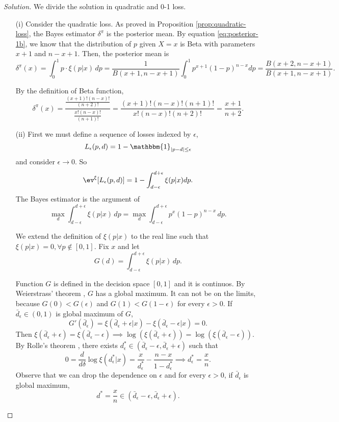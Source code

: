 \begin{proof}[Solution]
    We divide the solution in quadratic and 0-1 loss. 
    \begin{enumerate}
        \item[(i)] Consider the quadratic loss. As proved in Proposition \ref{prop:quadratic-loss}, the Bayes estimator $\delta^{\pi}$ is the
        posterior mean. By equation \ref{eq:posterior-1b}, we know that the
        distribution of $p$ given $X = x$ is Beta with parameters $x+1$ and
        $n-x+1$. Then, the posterior mean is 
        $$
        \delta^{\pi}(x) = \int_0^1 p \cdot\xi(p|x) \, dp = \frac{1}{B(x+1,n-x+1)}\int_0^1 p ^{x+1}(1-p)^{n-x} dp =  \frac{B(x+2,n-x+1)}{B(x+1,n-x+1)}.
        $$

        By the definition of Beta function, 
        $$
        \delta^{\pi}(x) = \frac{\frac{(x+1)!(n-x)!}{(n+2)!}}{\frac{x!(n-x)!}{(n+1)!}} = \frac{(x+1)!(n-x)!(n+1)!}{x!(n-x)!(n+2)!} = \frac{x+1}{n+2}.
        $$

        \item[(ii)] First we must define a sequence of losses indexed by
        $\epsilon$, 
        $$
        L_{\epsilon}(p, d) = 1 - \mathbbm{1}_{|p-d| \le \epsilon}
        $$
        and consider $\epsilon \to 0$. So 
        $$
        \ev^{\xi}[L_{\epsilon}(p, d)] = 1 - \int_{d - \epsilon}^{d + \epsilon} \xi(p|x) dp.
        $$
        The Bayes estimator is the argument of $$\max_d \int_{d - \epsilon}^{d
        + \epsilon} \xi(p|x) \, dp = \max_d \int_{d-\epsilon}^{d + \epsilon}
        p^x(1-p)^{n-x}\, dp.$$

        We extend the definition of $\xi(p|x)$ to the real line such
        that $\xi(p|x) = 0, \forall p \not\in [0,1]$. Fix $x$ and let 
        $$G(d) = \int_{d-\epsilon}^{d + \epsilon}
        \xi(p|x)\, dp.$$ 
        
        Function $G$ is defined in the decision space $[0,1]$ and it is
        continuos. By Weierstrass' theorem \cite[]{weierstrass}, $G$ has a global maximum. It can
        not be on the limits, because $G(0) < G(\epsilon)$ and $G(1) < G(1 - \epsilon)$
        for every $\epsilon > 0$. If $\bar{d}_{\epsilon} \in (0,1)$ is global
        maximum of $G$, 
        $$
        G'(\bar{d}_{\epsilon} ) = \xi(\bar{d}_{\epsilon}+\epsilon|x) - \xi(\bar{d}_{\epsilon}-\epsilon|x) = 0.
        $$
        Then $\xi(\bar{d}_{\epsilon} + \epsilon) = \xi(\bar{d}_{\epsilon} - \epsilon) \implies
        \log(\xi(\bar{d}_{\epsilon} + \epsilon)) = \log(\xi(\bar{d}_{\epsilon} - \epsilon))$. By
        Rolle's theorem \cite[]{rolle}, there exists $d^{*}_{\epsilon} \in
        (\bar{d}_{\epsilon} - \epsilon, \bar{d}_{\epsilon} + \epsilon)$ such
        that 
        $$
        0 = \frac{d}{d \delta} \log \xi(d^{*}_{\epsilon}|x) = \frac{x}{d^{*}_{\epsilon}} - \frac{n-x}{1 - d^{*}_{\epsilon}} \implies d^{*}_{\epsilon} = \frac{x}{n}.
        $$
        Observe that we can drop the dependence on $\epsilon$ and for every $\epsilon > 0$, if $\bar{d}_{\epsilon}$ is global
        maximum, 
        $$d^* = \frac{x}{n} \in (\bar{d}_{\epsilon} - \epsilon,
        \bar{d}_{\epsilon} + \epsilon).$$        


\end{enumerate}
\end{proof}
